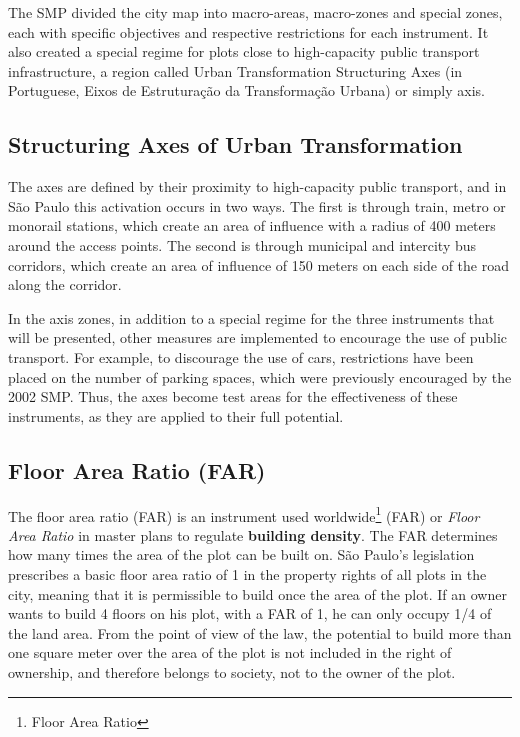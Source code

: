 The SMP divided the city map into macro-areas, macro-zones and special zones, each with specific objectives and respective restrictions for each instrument. It also created a special regime for plots close to high-capacity public transport infrastructure, a region called Urban Transformation Structuring Axes (in Portuguese, Eixos de Estruturação da Transformação Urbana) or simply axis.

\subsection*{Structuring Axes of Urban Transformation}

The axes are defined by their proximity to high-capacity public transport, and in São Paulo this activation occurs in two ways. The first is through train, metro or monorail stations, which create an area of influence with a radius of 400 meters around the access points. The second is through municipal and intercity bus corridors, which create an area of influence of 150 meters on each side of the road along the corridor.

In the axis zones, in addition to a special regime for the three instruments that will be presented, other measures are implemented to encourage the use of public transport. For example, to discourage the use of cars, restrictions have been placed on the number of parking spaces, which were previously encouraged by the 2002 SMP. Thus, the axes become test areas for the effectiveness of these instruments, as they are applied to their full potential.

\subsection*{Floor Area Ratio (FAR)}

The floor area ratio (FAR) is an instrument used worldwide\footnote{Floor Area Ratio} (FAR) or \textit{Floor Area Ratio} in master plans to regulate \textbf{building density}. The FAR determines how many times the area of the plot can be built on. São Paulo's legislation prescribes a basic floor area ratio of 1 in the property rights of all plots in the city, meaning that it is permissible to build once the area of the plot. If an owner wants to build 4 floors on his plot, with a FAR of 1, he can only occupy 1/4 of the land area. From the point of view of the law, the potential to build more than one square meter over the area of the plot is not included in the right of ownership, and therefore belongs to society, not to the owner of the plot.

